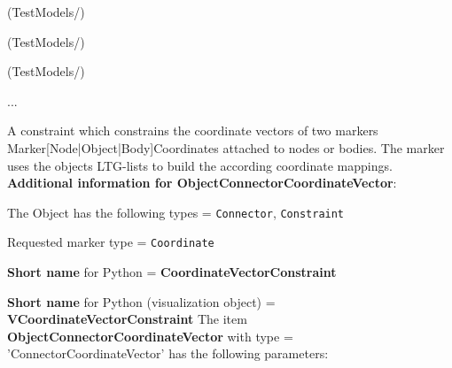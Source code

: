 \item {} (TestModels/)
\item {} (TestModels/)
\item {} (TestModels/)
\item  ...

\ei

%
\newpage

\label{sec:item:ObjectConnectorCoordinateVector}
A constraint which constrains the coordinate vectors of two markers Marker[Node|Object|Body]Coordinates attached to nodes or bodies. The marker uses the objects LTG-lists to build the according coordinate mappings.\vspace{12pt}
 \\{\bf Additional information for ObjectConnectorCoordinateVector}:
\bi
  \item The Object has the following types = \texttt{Connector}, \texttt{Constraint}
  \item Requested marker type = \texttt{Coordinate}
  \item {\bf Short name} for Python = {\bf CoordinateVectorConstraint}  \item {\bf Short name} for Python (visualization object) = {\bf VCoordinateVectorConstraint}\ei
\vspace{12pt} \noindent The item {\bf ObjectConnectorCoordinateVector} with type = 'ConnectorCoordinateVector' has the following parameters:\vspace{-1cm}\\ 
